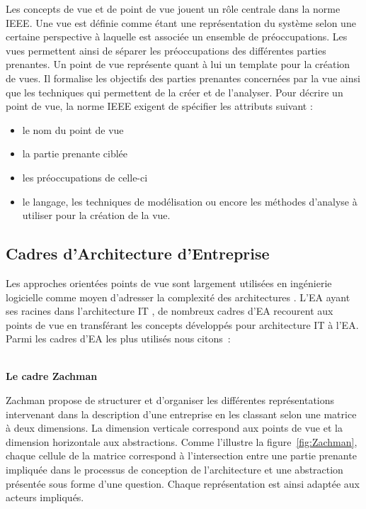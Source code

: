 Les concepts de vue et de point de vue jouent un rôle centrale dans la norme IEEE. Une vue est définie comme étant une représentation du système selon une certaine perspective à laquelle est associée un ensemble de préoccupations. Les vues permettent ainsi de séparer les préoccupations des différentes parties 
prenantes. Un point de vue représente quant à lui un template pour la création de 
vues. Il formalise les objectifs des parties prenantes concernées par la vue 
ainsi que les techniques qui permettent de la créer et de l'analyser. Pour 
décrire un point de vue, la norme IEEE exigent de spécifier les attributs 
suivant :
\begin{itemize}
\item le nom du point de vue
\item la partie prenante ciblée
\item les préoccupations de celle-ci
\item le langage, les techniques de modélisation ou encore les méthodes 
d'analyse à utiliser pour la création de la vue. 
\end{itemize}

	\subsection{Cadres d'Architecture d'Entreprise}

Les approches orientées points de vue sont largement utilisées en ingénierie logicielle comme moyen d'adresser la complexité des architectures \cite{steen2004supporting}. L'EA ayant ses racines dans l'architecture IT \cite{winter2008enterprise}, de nombreux cadres d'EA recourent aux points de vue en transférant les concepts développés pour architecture IT à l'EA. Parmi les cadres d'EA les plus utilisés nous citons~:
\\\

\textbf{Le cadre Zachman}

Zachman \cite{zachman1987framework} propose de structurer et d'organiser les différentes représentations intervenant dans la description d'une entreprise en les classant selon une matrice à deux dimensions. La dimension verticale correspond aux points de vue et la dimension horizontale aux abstractions. Comme l'illustre la figure~\ref{fig:Zachman}, chaque cellule de la matrice correspond à l'intersection entre une partie prenante impliquée dans le processus de conception de l'architecture et une abstraction présentée sous forme d'une question. Chaque représentation est ainsi adaptée aux acteurs impliqués. 


